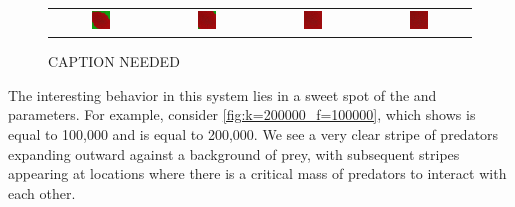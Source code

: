 \begin{figure}[h]
\begin{tabular}{c c c c}
\includegraphics[width = 0.2\textwidth]{../images/predator_prey_f1e6_d1e5_i4.png} & \includegraphics[width = 0.2\textwidth]{../images/../images/predator_prey_f1e6_d1e5_i5.png} & \includegraphics[width = 0.2\textwidth]{../images/../images/predator_prey_f1e6_d1e5_i6.png} & \includegraphics[width = 0.2\textwidth]{../images/../images/predator_prey_f1e6_d1e5_i7.png}
\end{tabular}
\caption{CAPTION NEEDED}
\label{fig:k=100000_f=1000000}
\end{figure}

The interesting behavior in this system lies in a sweet spot of the  and  parameters. For example, consider \autoref{fig:k=200000_f=100000}, which shows  is equal to 100,000 and  is equal to 200,000. We see a very clear stripe of predators expanding outward against a background of prey, with subsequent stripes appearing at locations where there is a critical mass of predators to interact with each other.\\

